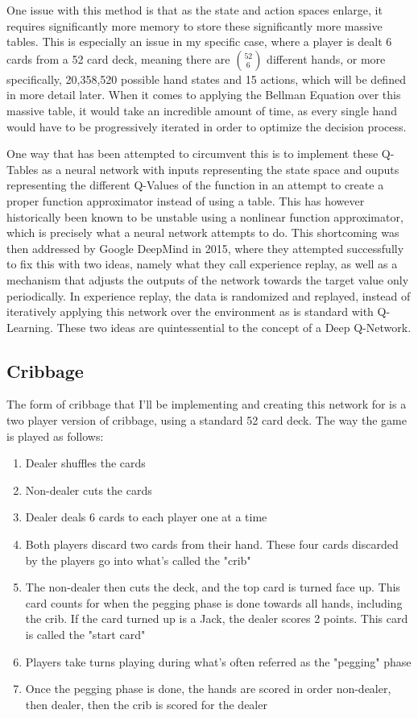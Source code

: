 \documentclass[]{article}
\begin{document}
One issue with this method is that as the state and action spaces enlarge, it requires significantly more memory to store these significantly more massive tables. This is especially an issue in my specific case, where a player is dealt 6 cards from a 52 card deck, meaning there are $52\choose{6}$ different hands, or more specifically, 20,358,520 possible hand states and 15 actions, which will be defined in more detail later. When it comes to applying the Bellman Equation over this massive table, it would take an incredible amount of time, as every single hand would have to be progressively iterated in order to optimize the decision process.

One way that has been attempted to circumvent this is to implement these Q-Tables as a neural network with inputs representing the state space and ouputs representing the different Q-Values of the function in an attempt to create a proper function approximator instead of using a table. This has however historically been known to be unstable using a nonlinear function approximator, which is precisely what a neural network attempts to do\cite{temp_diff_analysis}. This shortcoming was then addressed by Google DeepMind in 2015, where they attempted successfully to fix this with two ideas, namely what they call experience replay, as well as a mechanism that adjusts the outputs of the network towards the target value only periodically\cite{deepmind_2015}. In experience replay, the data is randomized and replayed, instead of iteratively applying this network over the environment as is standard with Q-Learning. These two ideas are quintessential to the concept of a Deep Q-Network\cite{drl_survey}.

\subsection{Cribbage}

The form of cribbage that I'll be implementing and creating this network for is a two player version of cribbage, using a standard 52 card deck. The way the game is played as follows:

\begin{enumerate}
    \item Dealer shuffles the cards 
    \item Non-dealer cuts the cards 
    \item Dealer deals 6 cards to each player one at a time 
    \item Both players discard two cards from their hand. These four cards discarded by the players go into what's called the "crib"
    \item The non-dealer then cuts the deck, and the top card is turned face up. This card counts for when the pegging phase is done towards all hands, including the crib. If the card turned up is a Jack, the dealer scores 2 points. This card is called the "start card"
    \item Players take turns playing during what's often referred as the "pegging" phase 
    \item Once the pegging phase is done, the hands are scored in order non-dealer, then dealer, then the crib is scored for the dealer
\end{enumerate}
\end{document}
